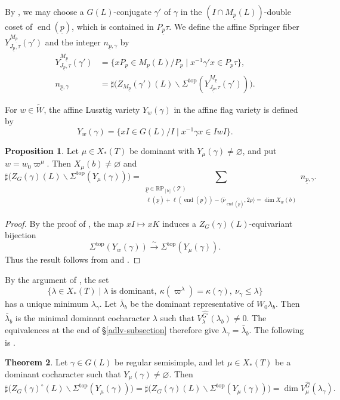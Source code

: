 \documentclass[12pt]{article}
\DeclareMathOperator{\en}{end}
\newcommand\tW{\tilde W}
\newcommand\tp{\mathrm{top}}
\newcommand\unp{\underline p}
\newcommand\vp{\varpi}
\theoremstyle{definition}
\newtheorem{theo}{Theorem}[section]
\newtheorem{prop}[theo]{Proposition}
\begin{document}
By \cite[Theorem 4.4]{HeALV}, we may choose a $G(L)$-conjugate $\gamma'$ of $\gamma$ in the $(I\cap M_{\unp}(L))$-double coset of $\en(\unp)$, which is contained in $P_{\unp}\tau$.
We define the affine Springer fiber $Y^{M_{\unp}}_{J_{\unp},\tau}(\gamma')$ and the integer $n_{\unp,\gamma}$ by
$$
\begin{aligned}
Y^{M_{\unp}}_{J_{\unp},\tau}(\gamma')
 &=\{xP_{\unp}\in M_{\unp}(L)/P_{\unp}\mid x^{-1}\gamma'x\in P_{\unp}\tau\},\\
n_{\unp,\gamma}
 &=\sharp\bigl(Z_{M_{\unp}}(\gamma')(L)\backslash
       \Sigma^{\tp}(Y^{M_{\unp}}_{J_{\unp},\tau}(\gamma'))\bigr).
\end{aligned}
$$

For $w\in\tW$, the affine Lusztig variety $Y_w(\gamma)$ in the affine flag variety is defined by
$$
Y_w(\gamma)=\{xI\in G(L)/I\mid x^{-1}\gamma x\in IwI\}.
$$

\begin{prop}\label{alv-grassmannian-path-count}
Let $\mu\in X_*(T)$ be dominant with $Y_\mu(\gamma)\ne\varnothing$, and put $w=w_0\vp^\mu$.
Then $X_\mu(b)\ne\varnothing$ and
$$
\sharp\bigl(Z_G(\gamma)(L)\backslash\Sigma^{\tp}(Y_\mu(\gamma))\bigr)
=\sum_{\substack{\unp\in\mathrm{RP}_{[b]}(\mathcal T)\\
\ell(\unp)+\ell(\en(\unp))-\langle\bar\nu_{\en(\unp)},2\rho\rangle=\dim X_w(b)}}
n_{\unp,\gamma}.
$$
\end{prop}

\begin{proof}
By the proof of \cite[Theorem 3.7]{He25}, the map $xI\mapsto xK$ induces a $Z_G(\gamma)(L)$-equivariant bijection
$$
\Sigma^{\tp}(Y_w(\gamma))\xrightarrow{\sim}\Sigma^{\tp}(Y_\mu(\gamma)).
$$
Thus the result follows from \cite[Theorem 2.8]{He25} and \cite[Theorem 6.7]{HeALV}.
\end{proof}

By the argument of \cite[Lemma 3.9.7]{Chi22}, the set
$$
\{\lambda\in X_*(T)\mid \lambda\text{ is dominant},\ \kappa(\vp^\lambda)=\kappa(\gamma),\ \nu_\gamma\le\lambda\}
$$
has a unique minimum $\lambda_\gamma$.
Let $\bar\lambda_b$ be the dominant representative of $W_0\lambda_b$.
Then $\bar\lambda_b$ is the minimal dominant cocharacter $\lambda$ such that $V_\lambda^{\widehat{G'}}(\lambda_b)\ne 0$.
The equivalences at the end of \S\ref{adlv-subsection} therefore give $\lambda_\gamma=\bar\lambda_b$.
The following is \cite[Conjecture 3.9.8]{Chi22}.
\begin{theo}\label{component-count}
Let $\gamma\in G(L)$ be regular semisimple, and let $\mu\in X_*(T)$ be a dominant cocharacter such that $Y_\mu(\gamma)\ne\varnothing$.
Then
$$
\sharp\bigl(Z_G(\gamma)^\circ(L)\backslash\Sigma^{\tp}(Y_\mu(\gamma))\bigr)
=\sharp\bigl(Z_G(\gamma)(L)\backslash\Sigma^{\tp}(Y_\mu(\gamma))\bigr)
=\dim V_\mu^{\widehat G}(\lambda_\gamma).
$$
\end{theo}
\end{document}

